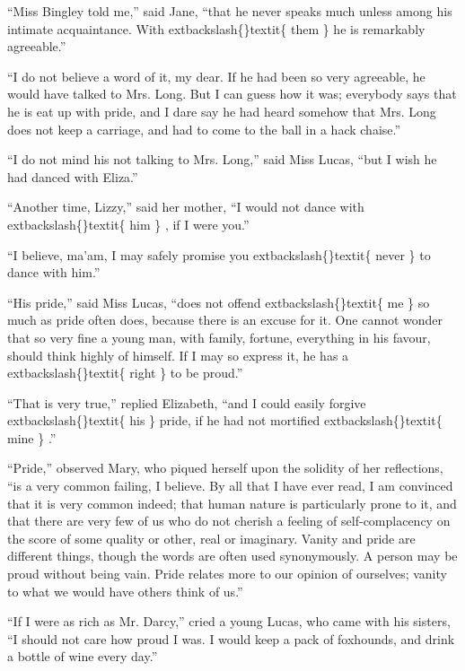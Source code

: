 \documentclass[10pt]{book}
\begin{document}
   “Miss Bingley told me,” said Jane, “that he never speaks much unless
among his intimate acquaintance. With
   	extbackslash\{\}textit\{
    them
   \}
   he is remarkably
agreeable.”
  

   “I do not believe a word of it, my dear. If he had been so very
agreeable, he would have talked to Mrs. Long. But I can guess how it
was; everybody says that he is eat up with pride, and I dare say he had
heard somehow that Mrs. Long does not keep a carriage, and had to come
to the ball in a hack chaise.”
  

   “I do not mind his not talking to Mrs. Long,” said Miss Lucas, “but I
wish he had danced with Eliza.”
  

   “Another time, Lizzy,” said her mother, “I would not dance with
   	extbackslash\{\}textit\{
    him
   \}
   ,
if I were you.”
  

   “I believe, ma’am, I may safely promise you
   	extbackslash\{\}textit\{
    never
   \}
   to dance with him.”
  

   “His pride,” said Miss Lucas, “does not offend
   	extbackslash\{\}textit\{
    me
   \}
   so much as pride
often does, because there is an excuse for it. One cannot wonder that so
very fine a young man, with family, fortune, everything in his favour,
should think highly of himself. If I may so express it, he has a
   	extbackslash\{\}textit\{
    right
   \}
   to be proud.”
  

   “That is very true,” replied Elizabeth, “and I could easily forgive
   	extbackslash\{\}textit\{
    his
   \}
   pride, if he had not mortified
   	extbackslash\{\}textit\{
    mine
   \}
   .”
  

   “Pride,” observed Mary, who piqued herself upon the solidity of her
reflections, “is a very common failing, I believe. By all that I have
ever read, I am convinced that it is very common indeed; that human
nature is particularly prone to it, and that there are very few of us
who do not cherish a feeling of self-complacency on the score of some
quality or other, real or imaginary. Vanity and pride are different
things, though the words are often
   used synonymously. A person may be
proud without being vain. Pride relates more to our opinion of
ourselves; vanity to what we would have others think of us.”
  

   “If I were as rich as Mr. Darcy,” cried a young Lucas, who came with his
sisters, “I should not care how proud I was. I would keep a pack of
foxhounds, and drink a bottle of wine every day.”
  
\end{document}
